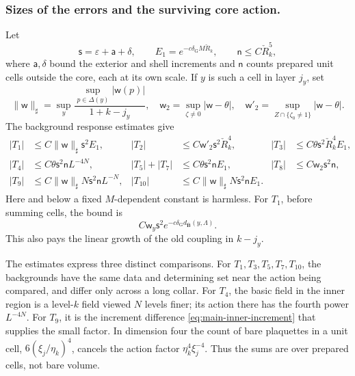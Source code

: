 \documentclass[11pt,letterpaper,reqno]{amsart}
\theoremstyle{definition}
\theoremstyle{remark}
\begin{document}
\subsubsection*{Sizes of the errors and the surviving core action.}

Let
\[
 \mathsf s=\varepsilon+\mathsf a+\delta,\qquad
 E_1=e^{-c\delta_{\mathrm G}M\check R_k},\qquad
 \mathsf n\le C\check R_k^5,
\]
where \(\mathsf a,\delta\) bound the exterior and shell
increments and \(\mathsf n\) counts prepared unit cells
outside the core, each at its own scale. If \(y\) is such
a cell in layer \(j_y\), set
\[
 \|\mathsf w\|_\sharp=
       \sup_y\frac{\sup_{p\in\Delta(y)}|\mathsf w(p)|}
                         {1+k-j_y},\quad
 \mathsf w_2=\sup_{\zeta\ne0}|\mathsf w-\theta|,\quad
 \mathsf w'_2=\sup_{Z\cap\{\zeta_0\ne1\}}|\mathsf w-\theta|.
\]
The background response estimates give
\begin{align}
 |T_1|&\le C\|\mathsf w\|_\sharp\mathsf s^2E_1,
 &|T_2|&\le C\mathsf w'_2\mathsf s^2\check R_k^4,
 &|T_3|&\le C\theta\mathsf s^2\check R_k^4E_1,
 \label{eq:main-outer-errors}\\
 |T_4|&\le C\theta\mathsf s^2\mathsf n L^{-4N},
 &|T_5|+|T_7|&\le C\theta\mathsf s^2\mathsf n E_1,
 &|T_8|&\le C\mathsf w_2\mathsf s^2\mathsf n,
 \label{eq:main-middle-errors}\\
 |T_9|&\le C\|\mathsf w\|_\sharp N\mathsf s^2\mathsf n L^{-N},
 &|T_{10}|&\le C\|\mathsf w\|_\sharp N\mathsf s^2\mathsf n E_1.
 \label{eq:main-inner-errors}
\end{align}
Here and below a fixed \(M\)-dependent constant is harmless.
For \(T_1\), before summing cells, the bound is
\[
 C\mathsf w_y\mathsf s^2
       e^{-c\delta_{\mathrm G}d_{\bar{\mathbf B}}(y,\Lambda)}.
\]
This also pays the linear growth of the old coupling in
\(k-j_y\).

The estimates express three distinct comparisons.
For \(T_1,T_3,T_5,T_7,T_{10}\), the backgrounds have the
same data and determining set near the action being
compared, and differ only across a long collar.
For \(T_4\), the basic field in the inner region is a
level-\(k\) field viewed \(N\) levels finer; its action
there has the fourth power \(L^{-4N}\).
For \(T_9\), it is the increment difference
\eqref{eq:main-inner-increment} that supplies the small
factor. In dimension four the count of bare plaquettes
in a unit cell, \(6(\xi_j/\eta_k)^4\), cancels the
action factor \(\eta_k^4\xi_j^{-4}\). Thus the sums
are over prepared cells, not bare volume.
\end{document}
